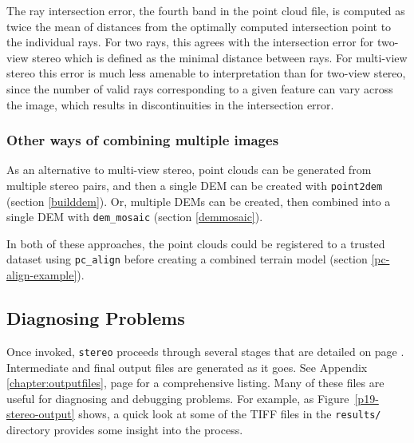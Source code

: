The ray intersection error, the fourth band in the point cloud
file, is computed as twice the mean of distances from the optimally
computed intersection point to the individual rays. For two rays, this
agrees with the intersection error for two-view stereo which is defined
as the minimal distance between rays. For multi-view stereo this error
is much less amenable to interpretation than for two-view stereo, since the
number of valid rays corresponding to a given feature can vary across
the image, which results in discontinuities in the intersection error.

\subsubsection*{Other ways of combining multiple images}

As an alternative to multi-view stereo, point clouds can be generated
from multiple stereo pairs, and then a single DEM can be created with
\texttt{point2dem} (section \ref{builddem}). Or, multiple DEMs
can be created, then combined into a single DEM with \texttt{dem\_mosaic}
(section \ref{demmosaic}).

In both of these approaches, the point clouds could be registered
to a trusted dataset using \texttt{pc\_align} before creating a combined
terrain model (section \ref{pc-align-example}).

\subsection{Diagnosing Problems}

Once invoked, \texttt{stereo} proceeds through several stages that are
detailed on page \pageref{entrypoints}.  Intermediate and final output
files are generated as it goes.  See Appendix
\ref{chapter:outputfiles}, page \pageref{chapter:outputfiles} for a
comprehensive listing.  Many of these files are useful for diagnosing and
debugging problems.  For example, as Figure~\ref{p19-stereo-output}
shows, a quick look at some of the TIFF files in the \texttt{results/}
directory provides some insight into the process.

